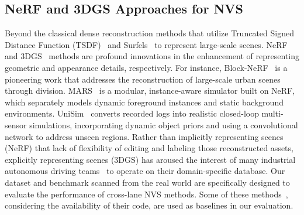 \subsection{NeRF and 3DGS Approaches for NVS} 
Beyond the classical dense reconstruction methods that utilize Truncated Signed Distance Function (TSDF)~\cite{dai2017bundlefusion} and Surfels~\cite{Whelan15rss} to represent large-scale scenes. NeRF~\cite{mildenhall2021nerf} and 3DGS~\cite{Kerbl20233dgs} methods are profound innovations in the enhancement of representing geometric and appearance details, respectively. 
For instance, Block-NeRF~\cite{tancik2022block} is a pioneering work that addresses the reconstruction of large-scale urban scenes through division.
MARS~\cite{wu2023mars} is a modular, instance-aware simulator built on NeRF, which separately models dynamic foreground instances and static background environments. 
UniSim~\cite{yang2023unisim} converts recorded logs into realistic closed-loop multi-sensor simulations, incorporating dynamic object priors and using a convolutional network to address unseen regions. Rather than implicitly representing scenes (NeRF) that lack of flexibility of editing and labeling those reconstructed assets, explicitly representing scenes (3DGS) has aroused the interest of many industrial autonomous driving teams~\cite{yan2024street} to operate on their domain-specific database. 
Our dataset and benchmark scanned from the real world are specifically designed to evaluate the performance of cross-lane NVS methods. Some of these methods~\cite{Kerbl20233dgs,chen2023pvg,cheng2024gaussianpro,Lu2024scaffoldgs,Huang20242DGS,yan2024street}, considering the availability of their code, are used as baselines in our evaluation. 
